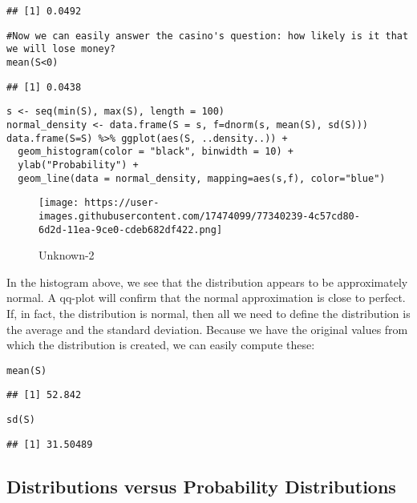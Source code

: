 \documentclass[
]{article}
\begin{document}
\begin{verbatim}
## [1] 0.0492
\end{verbatim}

\begin{verbatim}
#Now we can easily answer the casino's question: how likely is it that we will lose money?
mean(S<0)
\end{verbatim}

\begin{verbatim}
## [1] 0.0438
\end{verbatim}

\begin{verbatim}
s <- seq(min(S), max(S), length = 100)
normal_density <- data.frame(S = s, f=dnorm(s, mean(S), sd(S)))
data.frame(S=S) %>% ggplot(aes(S, ..density..)) +
  geom_histogram(color = "black", binwidth = 10) +
  ylab("Probability") +
  geom_line(data = normal_density, mapping=aes(s,f), color="blue")
\end{verbatim}

\begin{figure}
\centering
\texttt{[image: https://user-images.githubusercontent.com/17474099/77340239-4c57cd80-6d2d-11ea-9ce0-cdeb682df422.png]}
\caption{Unknown-2}
\end{figure}

In the histogram above, we see that the distribution appears to be
approximately normal. A qq-plot will confirm that the normal
approximation is close to perfect. If, in fact, the distribution is
normal, then all we need to define the distribution is the average and
the standard deviation. Because we have the original values from which
the distribution is created, we can easily compute these:

\begin{verbatim}
mean(S)
\end{verbatim}

\begin{verbatim}
## [1] 52.842
\end{verbatim}

\begin{verbatim}
sd(S)
\end{verbatim}

\begin{verbatim}
## [1] 31.50489
\end{verbatim}

\hypertarget{distributions-versus-probability-distributions}{%
\subsection{Distributions versus Probability
Distributions}\label{distributions-versus-probability-distributions}}
\end{document}
